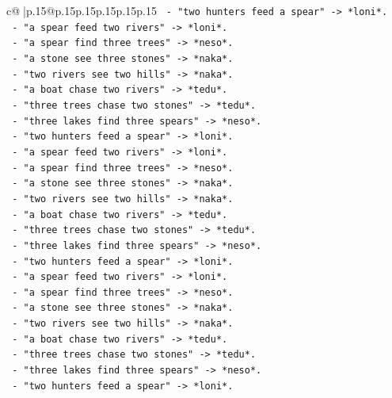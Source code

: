 \documentclass{article}
\begin{document}
{\begin{supertabular}{c@{$\;$}|p{.15\linewidth}@{}p{.15\linewidth}p{.15\linewidth}p{.15\linewidth}p{.15\linewidth}p{.15\linewidth}}
{{{\texttt{           {-} "two hunters feed a spear" {-}> *loni*.} \\
\texttt{           {-} "a spear feed two rivers" {-}> *loni*.} \\
\texttt{           {-} "a spear find three trees" {-}> *neso*.} \\
\texttt{           {-} "a stone see three stones" {-}> *naka*.} \\
\texttt{           {-} "two rivers see two hills" {-}> *naka*.} \\
\texttt{           {-} "a boat chase two rivers" {-}> *tedu*.} \\
\texttt{           {-} "three trees chase two stones" {-}> *tedu*.} \\
\texttt{           {-} "three lakes find three spears" {-}> *neso*.} \\
\texttt{           {-} "two hunters feed a spear" {-}> *loni*.} \\
\texttt{           {-} "a spear feed two rivers" {-}> *loni*.} \\
\texttt{           {-} "a spear find three trees" {-}> *neso*.} \\
\texttt{           {-} "a stone see three stones" {-}> *naka*.} \\
\texttt{           {-} "two rivers see two hills" {-}> *naka*.} \\
\texttt{           {-} "a boat chase two rivers" {-}> *tedu*.} \\
\texttt{           {-} "three trees chase two stones" {-}> *tedu*.} \\
\texttt{           {-} "three lakes find three spears" {-}> *neso*.} \\
\texttt{           {-} "two hunters feed a spear" {-}> *loni*.} \\
\texttt{           {-} "a spear feed two rivers" {-}> *loni*.} \\
\texttt{           {-} "a spear find three trees" {-}> *neso*.} \\
\texttt{           {-} "a stone see three stones" {-}> *naka*.} \\
\texttt{           {-} "two rivers see two hills" {-}> *naka*.} \\
\texttt{           {-} "a boat chase two rivers" {-}> *tedu*.} \\
\texttt{           {-} "three trees chase two stones" {-}> *tedu*.} \\
\texttt{           {-} "three lakes find three spears" {-}> *neso*.} \\
\texttt{           {-} "two hunters feed a spear" {-}> *loni*.} \\
}}}
\end{supertabular}}
\end{document}
